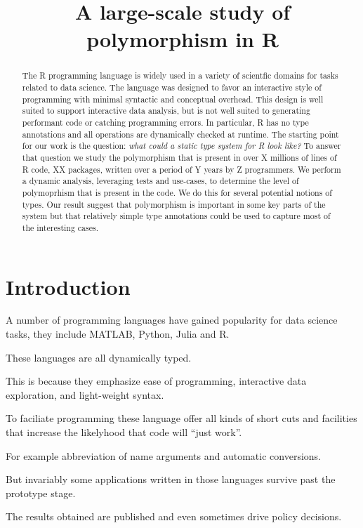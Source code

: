 \documentclass[acmsmall,10pt,review,anonymous]{acmart}\settopmatter{printfolios=true,printccs=false,printacmref=false}
\begin{document}
\title{A large-scale study of polymorphism in R}

\begin{abstract}
The R programming language is widely used in a variety of scientfic domains
for tasks related to data science. The language was designed to favor an
interactive style of programming with minimal syntactic and conceptual
overhead. This design is well suited to support interactive data analysis,
but is not well suited to generating performant code or catching programming
errors.  In particular, R has no type annotations and all operations are
dynamically checked at runtime. The starting point for our work is the
question: \emph{what could a static type system for R look like?}  To answer
that question we study the polymorphism that is present in over X millions
of lines of R code, XX packages, written over a period of Y years by Z
programmers.  We perform a dynamic analysis, leveraging tests and use-cases,
to determine the level of polymoprhism that is present in the code. We do
this for several potential notions of types. Our result suggest that
polymorphism is important in some key parts of the system but that
relatively simple type annotations could be used to capture most of the
interesting cases.
\end{abstract}
\maketitle

\section{Introduction}

A number of programming languages have gained popularity for data science
tasks, they include MATLAB, Python, Julia and R.

These languages are all dynamically typed.

This is because they emphasize ease of programming, interactive data
exploration, and light-weight syntax.

To faciliate programming these language offer all kinds of short cuts and
facilities that increase the likelyhood that code will ``just work''.

For example abbreviation of name arguments and automatic conversions.

But invariably some applications written in those languages survive past the prototype stage.

The results obtained are published and even sometimes drive policy decisions.
\end{document}
